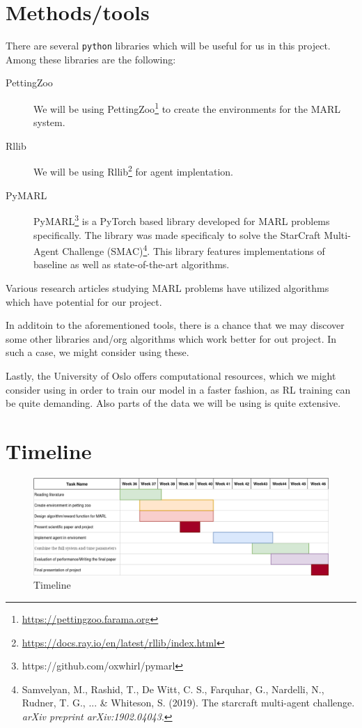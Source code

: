 \documentclass{article}
\begin{document}
\section{Methods/tools}
There are several \texttt{python} libraries which will be useful for us in this project.
Among these libraries are the following:
\begin{description}
  \item[PettingZoo] We will be using PettingZoo\footnote[1]{\url{https://pettingzoo.farama.org}}
    to create the environments for the MARL system.
  \item[Rllib] We will be using Rllib\footnote[2]{\url{https://docs.ray.io/en/latest/rllib/index.html}}
    for agent implentation.
  \item[PyMARL] PyMARL\footnote[3]{https://github.com/oxwhirl/pymarl} is a PyTorch based library
    developed for MARL problems specifically. The library was made specificaly to solve the StarCraft
    Multi-Agent Challenge (SMAC)\footnote[4]{Samvelyan, M., Rashid, T., De Witt, C. S., Farquhar, G., Nardelli, N., Rudner, T. G., ... \& Whiteson, S. (2019). The starcraft multi-agent challenge. \textit{arXiv preprint arXiv:1902.04043}.}. %
    This library features implementations of baseline as well as state-of-the-art algorithms.
\end{description}

\noindent
Various research articles studying MARL problems have utilized algorithms which have potential for our
project.

\noindent
In additoin to the aforementioned tools, there is a chance that we may discover some other libraries and/org
algorithms which work better for out project. In such a case, we might consider using these.

\noindent
Lastly, the University of Oslo offers computational resources, which we might consider using in order to
train our model in a faster fashion, as RL training can be quite demanding. Also parts of the data we will be using is quite extensive.

\section{Timeline}
\begin{figure}[h]
    \begin{center}
        \includegraphics[width=\textwidth]{Timeline.png}
    \end{center}
    \caption{Timeline}
    \label{fig:timeline}
\end{figure}
\end{document}
